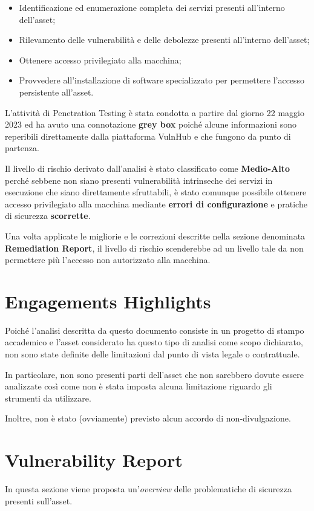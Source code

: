 \documentclass[a4paper, 12pt, oneside]{article}
\begin{document}
\begin{itemize}
    \item Identificazione ed enumerazione completa dei servizi presenti all'interno dell'asset;
    \item Rilevamento delle vulnerabilità e delle debolezze presenti all'interno dell'asset;
    \item Ottenere accesso privilegiato alla macchina;
    \item Provvedere all'installazione di software specializzato per permettere l'accesso persistente all'asset.
\end{itemize}

L'attività di Penetration Testing è stata condotta a partire dal giorno 22 maggio 2023 ed ha avuto una connotazione \textbf{grey box} poiché alcune informazioni sono reperibili direttamente dalla piattaforma VulnHub e che fungono da punto di partenza.

Il livello di rischio derivato dall'analisi è stato classificato come \textbf{Medio-Alto} perché sebbene non siano presenti vulnerabilità intrinseche dei servizi in esecuzione che siano direttamente sfruttabili, è stato comunque possibile ottenere accesso privilegiato alla macchina mediante \textbf{errori di configurazione} e pratiche di sicurezza \textbf{scorrette}.

Una volta applicate le migliorie e le correzioni descritte nella sezione denominata \textbf{Remediation Report}, il livello di rischio scenderebbe ad un livello tale da non permettere più l'accesso non autorizzato alla macchina.

\newpage

\section{Engagements Highlights}
Poiché l'analisi descritta da questo documento consiste in un progetto di stampo accademico e l'asset considerato ha questo tipo di analisi come scopo dichiarato, non sono state definite delle limitazioni dal punto di vista legale o contrattuale. 

In particolare, non sono presenti parti dell'asset che non sarebbero dovute essere analizzate così come non è stata imposta alcuna limitazione riguardo gli strumenti da utilizzare. 

Inoltre, non è stato (ovviamente) previsto alcun accordo di non-divulgazione.

\newpage

\section{Vulnerability Report}
\label{sec:vulnrep}
In questa sezione viene proposta un'\textit{overview} delle problematiche di sicurezza presenti sull'asset.
\end{document}
